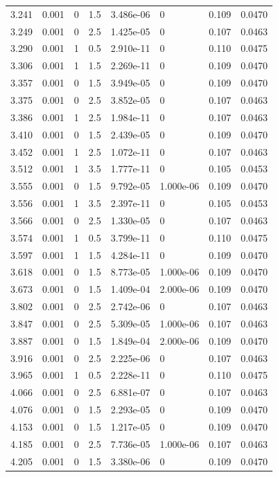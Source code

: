 \documentclass[preview]{standalone}
\begin{document}
{{{\begin{tabular}{L{1.2cm}C{1.2cm} C{0.3cm}C{0.5cm} C{1.4cm}C{1.4cm} C{1.4cm}C{1.4cm}}
  3.241  &  0.001  & 0     & 1.5 &  3.486e-06  & 0  & 0.109 &  0.0470   \\ 
  3.249  &  0.001  & 0     & 2.5 &  1.425e-05  & 0  & 0.107 &  0.0463   \\ 
  3.290  &  0.001  & 1     & 0.5 &  2.910e-11  & 0  & 0.110 &  0.0475   \\ 
  3.306  &  0.001  & 1     & 1.5 &  2.269e-11  & 0  & 0.109 &  0.0470   \\ 
  3.357  &  0.001  & 0     & 1.5 &  3.949e-05  & 0  & 0.109 &  0.0470   \\ 
  3.375  &  0.001  & 0     & 2.5 &  3.852e-05  & 0  & 0.107 &  0.0463   \\ 
  3.386  &  0.001  & 1     & 2.5 &  1.984e-11  & 0  & 0.107 &  0.0463   \\ 
  3.410  &  0.001  & 0     & 1.5 &  2.439e-05  & 0  & 0.109 &  0.0470   \\ 
  3.452  &  0.001  & 1     & 2.5 &  1.072e-11  & 0  & 0.107 &  0.0463   \\ 
  3.512  &  0.001  & 1     & 3.5 &  1.777e-11  & 0  & 0.105 &  0.0453   \\ 
  3.555  &  0.001  & 0     & 1.5 &  9.792e-05  & 1.000e-06  & 0.109 &  0.0470   \\ 
  3.556  &  0.001  & 1     & 3.5 &  2.397e-11  & 0  & 0.105 &  0.0453   \\ 
  3.566  &  0.001  & 0     & 2.5 &  1.330e-05  & 0  & 0.107 &  0.0463   \\ 
  3.574  &  0.001  & 1     & 0.5 &  3.799e-11  & 0  & 0.110 &  0.0475   \\ 
  3.597  &  0.001  & 1     & 1.5 &  4.284e-11  & 0  & 0.109 &  0.0470   \\ 
  3.618  &  0.001  & 0     & 1.5 &  8.773e-05  & 1.000e-06  & 0.109 &  0.0470   \\ 
  3.673  &  0.001  & 0     & 1.5 &  1.409e-04  & 2.000e-06  & 0.109 &  0.0470   \\ 
  3.802  &  0.001  & 0     & 2.5 &  2.742e-06  & 0  & 0.107 &  0.0463   \\ 
  3.847  &  0.001  & 0     & 2.5 &  5.309e-05  & 1.000e-06  & 0.107 &  0.0463   \\ 
  3.887  &  0.001  & 0     & 1.5 &  1.849e-04  & 2.000e-06  & 0.109 &  0.0470   \\ 
  3.916  &  0.001  & 0     & 2.5 &  2.225e-06  & 0  & 0.107 &  0.0463   \\ 
  3.965  &  0.001  & 1     & 0.5 &  2.228e-11  & 0  & 0.110 &  0.0475   \\ 
  4.066  &  0.001  & 0     & 2.5 &  6.881e-07  & 0  & 0.107 &  0.0463   \\ 
  4.076  &  0.001  & 0     & 1.5 &  2.293e-05  & 0  & 0.109 &  0.0470   \\ 
  4.153  &  0.001  & 0     & 1.5 &  1.217e-05  & 0  & 0.109 &  0.0470   \\ 
  4.185  &  0.001  & 0     & 2.5 &  7.736e-05  & 1.000e-06  & 0.107 &  0.0463   \\ 
  4.205  &  0.001  & 0     & 1.5 &  3.380e-06  & 0  & 0.109 &  0.0470   \\ 
\hline 
\end{tabular} 

}}}
\end{document}
